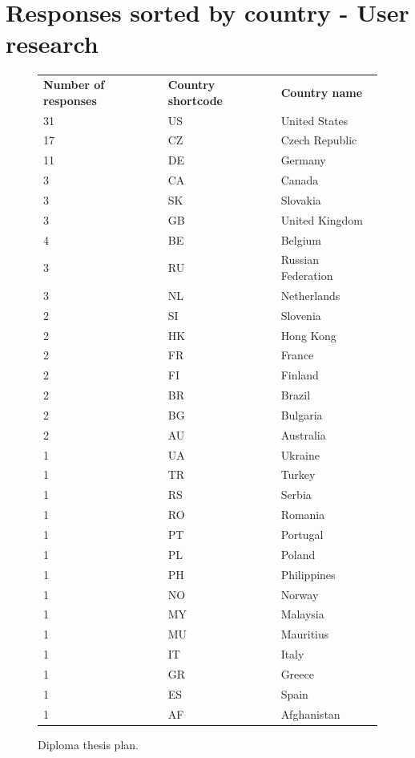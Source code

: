 \documentclass[
  printed, %
  table,   %
  lof,     %
  lot,     %
           oneside, color
]{fithesis3}
\begin{document}
\chapter{Responses sorted by country - User research}
\vspace{-1em}
\begin{figure}[H]
\center
\begin{footnotesize}
\begin{tabular}{lll}
\textbf{Number of responses} & \textbf{Country shortcode} & \textbf{Country name} \\
31 & US & United States      \\
17 & CZ & Czech Republic     \\
11 & DE & Germany            \\
3  & CA & Canada             \\
3  & SK & Slovakia           \\
3  & GB & United Kingdom     \\
4  & BE & Belgium            \\
3  & RU & Russian Federation \\
3  & NL & Netherlands        \\
2  & SI & Slovenia           \\
2  & HK & Hong Kong          \\
2  & FR & France             \\
2  & FI & Finland            \\
2  & BR & Brazil             \\
2  & BG & Bulgaria           \\
2  & AU & Australia          \\
1  & UA & Ukraine            \\
1  & TR & Turkey             \\
1  & RS & Serbia             \\
1  & RO & Romania            \\
1  & PT & Portugal           \\
1  & PL & Poland             \\
1  & PH & Philippines        \\
1  & NO & Norway             \\
1  & MY & Malaysia           \\
1  & MU & Mauritius          \\
1  & IT & Italy              \\
1  & GR & Greece             \\
1  & ES & Spain              \\
1  & AF & Afghanistan       
\end{tabular}
\end{footnotesize}
\caption{Diploma thesis plan.}
\label{table:countries}
\end{figure}
\end{document}
